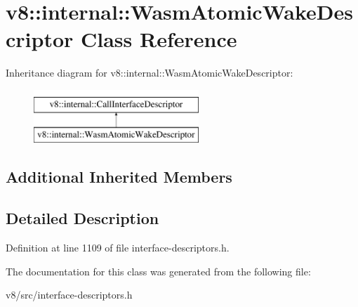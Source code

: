 \hypertarget{classv8_1_1internal_1_1WasmAtomicWakeDescriptor}{}\section{v8\+:\+:internal\+:\+:Wasm\+Atomic\+Wake\+Descriptor Class Reference}
\label{classv8_1_1internal_1_1WasmAtomicWakeDescriptor}
Inheritance diagram for v8\+:\+:internal\+:\+:Wasm\+Atomic\+Wake\+Descriptor\+:\begin{figure}[H]
\begin{center}
\leavevmode
\includegraphics[height=2.000000cm]{classv8_1_1internal_1_1WasmAtomicWakeDescriptor}
\end{center}
\end{figure}
\subsection*{Additional Inherited Members}


\subsection{Detailed Description}


Definition at line 1109 of file interface-\/descriptors.\+h.



The documentation for this class was generated from the following file\+:\begin{DoxyCompactItemize}
\item 
v8/src/interface-\/descriptors.\+h\end{DoxyCompactItemize}
